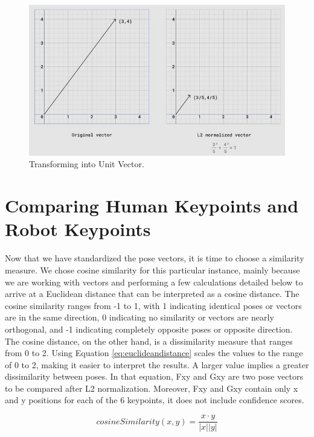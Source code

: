\begin{figure}[ht]
  \centering
  \includegraphics[scale=0.8]{gambar/transform-to-unit-vector.png}
  \caption{Transforming into Unit Vector.}
  \label{fig:transforming-into-unit-vector}
\end{figure}


\section{Comparing Human Keypoints and Robot Keypoints}
\label{sec:comparing-keypoints}

Now that we have standardized the pose vectors, it is time to choose a similarity measure. We chose cosine similarity for this particular instance, mainly because we are working with vectors and performing a few calculations detailed below to arrive at a Euclidean distance that can be interpreted as a cosine distance.
The cosine similarity ranges from -1 to 1, with 1 indicating identical poses or vectors are in the same direction, 0 indicating no similarity or vectors are nearly orthogonal, and -1 indicating completely opposite poses or opposite direction. The cosine distance, on the other hand, is a dissimilarity measure that ranges from 0 to 2.
Using Equation \ref{eq:euclideandistance} scales the values to the range of 0 to 2, making it easier to interpret the results. A larger value implies a greater dissimilarity between poses. In that equation, Fxy and Gxy are two pose vectors to be compared after L2 normalization. Moreover, Fxy and Gxy contain only x and y positions for each of the 6 keypoints, it does not include confidence scores.

\begin{equation}
  \label{eq:cosinesimilarity}
  cosineSimilarity(x,y) = \frac{x \cdot y}{|x||y|}
\end{equation}

